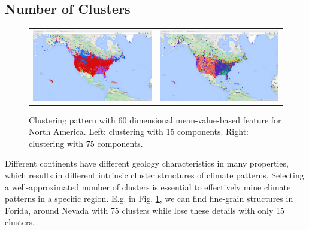 \subsection{Number of Clusters}
\begin{figure}
    \centering
    \begin{tabular}{c c}
        \includegraphics[width=.45\linewidth]{./figure/Ave_60_comp_15_clu_USA.png}
        & \includegraphics[width=.45\linewidth]{./figure/Ave_60_comp_75_clu_USA.png}
    \end{tabular}
    \caption{Clustering pattern with 60 dimensional mean-value-based feature for North America. Left: clustering with 15 components. Right: clustering with 75 components.}
    \label{fig:CluNum}
\end{figure}

Different continents have different geology characteristics in many properties, which results in different intrinsic cluster structures of climate patterns. Selecting a well-approximated number of clusters is essential to effectively mine climate patterns in a specific region. E.g. in Fig. \ref{fig:CluNum}, we can find fine-grain structures in Forida, around Nevada with 75 clusters while lose these details with only 15 clusters.

